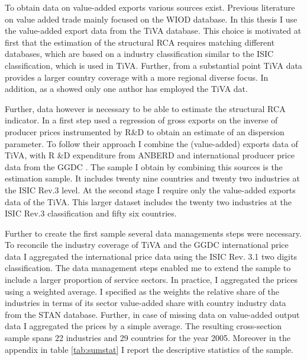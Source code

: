 \par %
To obtain data on value-added exports various sources exist. Previous literature on value added trade mainly focused on the WIOD \textcite{Timmer2012} database. In this thesis I use the value-added export data from the TiVA \textcite{tiva2} database. This choice is motivated at first that the estimation of the structural RCA requires matching different databases, which are based on a industry classification similar to the ISIC classification, which is used in TiVA. Further, from a substantial point TiVA data provides a larger country coverage with a more regional diverse focus. In addition, as a \textcite{johnson} showed only one author has employed the TiVA dat. \par
Further, data however is necessary to be able to estimate the structural RCA indicator. In a first step \textcite{costinot}  used a regression of gross exports on the inverse of producer prices instrumented by R\&D to obtain an estimate of an dispersion parameter. To follow their approach I combine  the (value-added) exports data of \textcite{tiva2} TiVA, with  R \&D expenditure from \textcite{stan2} ANBERD and  international producer price data from the GGDC  \parencite{Inklaar2012}. The sample I obtain by combining this sources is the estimation sample. It includes twenty nine countries and twenty two industries at the ISIC Rev.3 level. At the second stage I require only the value-added exports data of the TiVA. This larger dataset includes the twenty two industries at the ISIC Rev.3 classification and fifty six countries.
\par
Further to create the first sample several data managements steps were necessary. To reconcile the industry coverage of TiVA and the GGDC international price data I aggregated the international price data using the ISIC Rev. 3.1 two digits classification. The data management steps enabled me to extend the sample to include a larger proportion of service sectors. In practice, I aggregated  the prices using a weighted average. I specified as the  weights the relative share of the industries in terms of its sector value-added share with country industry data from the  \textcite{OECDSTAN} STAN database. Further, in case of missing data on value-added output data  I aggregated the prices by a simple average. The resulting cross-section sample spans 22 industries and  29 countries for the year 2005.  Moreover in the appendix in table \ref{tab:sumstat} I report the descriptive statistics of the sample.  \par 

